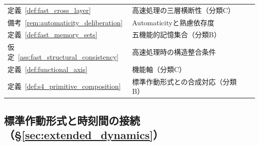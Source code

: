 \begin{longtable}{p{2.4cm} p{10.4cm} r}
定義~\ref{def:fast_cross_layer} & 高速処理の三層横断性（分類C） & \pageref{def:fast_cross_layer} \\
備考~\ref{rem:automaticity_deliberation} & Automaticityと熟慮依存度 & \pageref{rem:automaticity_deliberation} \\
定義~\ref{def:fast_memory_sets} & 五機能的記憶集合（分類B） & \pageref{def:fast_memory_sets} \\
仮定~\ref{ass:fast_structural_consistency} & 高速処理時の構造整合条件 & \pageref{ass:fast_structural_consistency} \\
定義~\ref{def:functional_axis} & 機能軸（分類C） & \pageref{def:functional_axis} \\
定義~\ref{def:s4_primitive_composition} & 標準作動形式との合成対応（分類B） & \pageref{def:s4_primitive_composition} \\
\end{longtable}
\endgroup

\subsection*{標準作動形式と時刻間の接続（\S\ref{sec:extended_dynamics}）}

